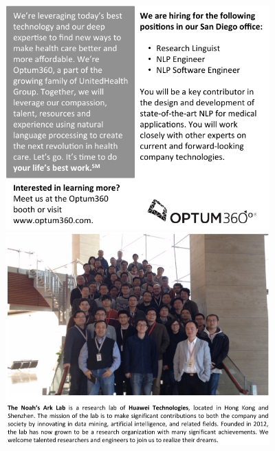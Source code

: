 \thispagestyle{empty}
\includegraphics[width=4in]{content/ads/ads/optum360_half_page} \\

\thispagestyle{empty}
\includegraphics[width=4in]{content/ads/ads/huawei_quarter_page}

